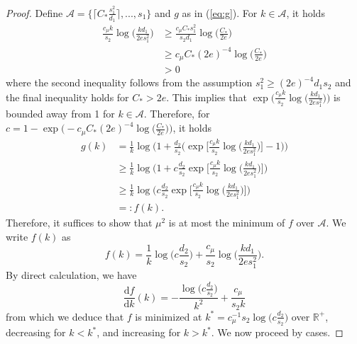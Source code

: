 \documentclass{article}
\newcommand{\D}{\textrm{d}}
\newcommand{\R}{\mathbb{R}}
\newcommand{\cA}{\mathcal{A}}
\newcommand{\Ct}{C_{*}}
\theoremstyle{remark}
\begin{document}
\begin{proof}
    Define $\cA = \{\lceil  \Ct \frac{s_1^2}{d_1}\rceil, ..., s_1 \}$ and $g$ as in (\ref{eq:g}). For $k \in \cA$, it holds 
    \begin{align*}
        \frac{c_\mu k}{s_2}\log\Big(\frac{kd_1}{2es_1^2}\Big) &\geq \frac{c_\mu \Ct s_1^2}{s_2d_1}\log\Big(\frac{\Ct}{2e}\Big) \\
        &\geq c_\mu \Ct (2e)^{-4}\log \Big(\frac{\Ct}{2e}\Big) \\
        &> 0
    \end{align*}
    where the second inequality follows from the assumption $s_1^2 \geq (2e)^{-4}d_1s_2$ and the final inequality holds for $\Ct > 2e$. This implies that $\exp\Big(\frac{c_\mu k}{s_2}\log\Big(\frac{kd_1}{2es_1^2}\Big)\Big)$ is bounded away from 1 for $k \in \cA$. Therefore, for $c = 1 - \exp\Big(-c_\mu \Ct (2e)^{-4}\log \Big(\frac{\Ct}{2e}\Big)\Big)$, it holds
    \begin{align*}
        g(k) &= \frac{1}{k}\log\Bigg(1 + \frac{d_2}{s_2}\bigg(\exp\Big[\frac{c_\mu k}{s_2}\log\big(\frac{kd_1}{2es_1^2}\big)\Big] - 1\bigg)\Bigg)\\
        &\geq \frac{1}{k}\log\Bigg(1 + c\frac{d_2}{s_2}\exp\Big[\frac{c_\mu k}{s_2}\log\big(\frac{kd_1}{2es_1^2}\big)\Big]\Bigg)\\
        &\geq \frac{1}{k}\log\Bigg(c\frac{d_2}{s_2}\exp\Big[\frac{c_\mu k}{s_2}\log\big(\frac{kd_1}{2es_1^2}\big)\Big]\Bigg) \\
        &=: f(k).
    \end{align*}
    Therefore, it suffices to show that $\mu^2$ is at most the minimum of $f$ over $\cA$. We write $f(k)$ as 
    \[f(k) = \frac{1}{k}\log\Big(c\frac{d_2}{s_2}\Big) + \frac{c_\mu}{s_2}\log\Big(\frac{kd_1}{2es_1^2}\Big).\]
    By direct calculation, we have
    \[\frac{\D f}{\D k}(k) = -\frac{\log\big(c\frac{d_2}{s_2}\big)}{k^2} + \frac{c_\mu}{s_2k}\]
    from which we deduce that $f$ is minimized at $k^* = c_\mu^{-1}s_2\log\big(c\frac{d_2}{s_2}\big)$ over $\R^+$, decreasing for $k < k^*$, and increasing for $k > k^*$. We now proceed by cases.


\end{proof}
\end{document}
